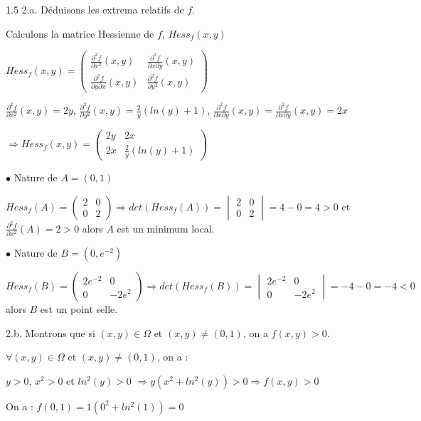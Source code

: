 \documentclass[12pt]{article}
\begin{document}
\begin{spacing}{1.5}
2.a. Déduisons les extrema relatifs de $f$.

Calculons la matrice Hessienne de $f$, $Hess_f(x,y)$

$Hess_f(x,y)=\begin{pmatrix}
\frac{\partial^2{f}}{\partial{x^2}}(x,y) & \frac{\partial^2{f}}{\partial{x}\partial{y}}(x,y) \\ 
\frac{\partial^2{f}}{\partial{y}\partial{x}}(x,y) & \frac{\partial^2{f}}{\partial{y^2}}(x,y)
\end{pmatrix}$

$\frac{\partial^2{f}}{\partial{x^2}}(x,y)=2y$, $\frac{\partial^2{f}}{\partial{y^2}}(x,y)=\frac{2}{y}(ln(y)+1)$, $\frac{\partial^2{f}}{\partial{x}\partial{y}}(x,y)=\frac{\partial^2{f}}{\partial{x}\partial{y}}(x,y)=2x$

$\Longrightarrow Hess_f(x,y)=\begin{pmatrix}
2y & 2x \\ 
2x & \frac{2}{y}(ln(y)+1)
\end{pmatrix}$

$\bullet$ Nature de $A=(0,1)$

$Hess_f(A)=\begin{pmatrix}
2 & 0 \\ 
0 & 2
\end{pmatrix} \Longrightarrow det(Hess_f(A))=\begin{vmatrix}
2 & 0 \\ 
0 & 2
\end{vmatrix}=4-0=4>0$ et $\frac{\partial^2{f}}{\partial{x^2}}(A)=2>0$ alors $A$ est un minimum local.

$\bullet$ Nature de $B=(0,e^{-2})$

$Hess_f(B)=\begin{pmatrix}
2e^{-2} & 0 \\ 
0 & -2e^2
\end{pmatrix} \Longrightarrow det(Hess_f(B))=\begin{vmatrix}
2e^{-2} & 0 \\ 
0 & -2e^{2}
\end{vmatrix}=-4-0=-4<0$ alors $B$ est un point selle.


2.b. Montrons que si $(x,y)\in\Omega$ et $(x,y)\neq(0,1)$, on a $f(x,y)>0$.

$\forall (x,y)\in\Omega$ et $(x,y)\neq(0,1)$, on a :

$y>0$, $x^2>0$ et $ln^2(y)>0$ $\Rightarrow y(x^2+ln^2(y))>0\Rightarrow f(x,y)>0$

\medskip
On a : $f(0,1)=1(0^2+ln^2(1))=0$


\end{spacing}
\end{document}

